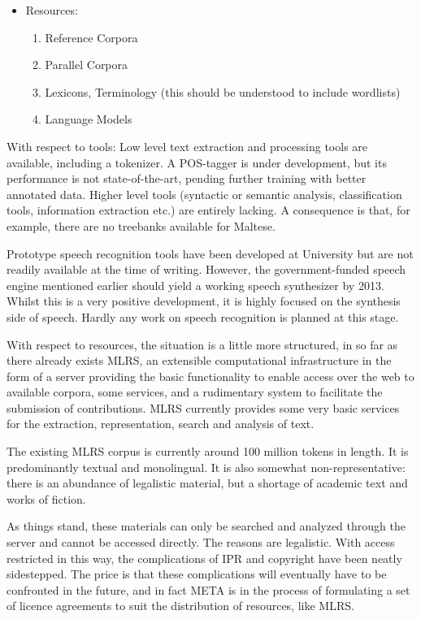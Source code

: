 \documentclass[]{../../metanetpaper}
\begin{document}
\begin{multicols}{2}
\begin{itemize}
\item Resources:
\begin{enumerate}
\item Reference Corpora
\item Parallel Corpora
\item Lexicons, Terminology (this should be understood to include wordlists)
\item Language Models
\end{enumerate}
\end{itemize}

With respect to tools:
Low level text extraction and processing tools are available, including a tokenizer. A POS-tagger is under development, but its performance is not state-of-the-art, pending further training with better annotated data. 
Higher level tools (syntactic or semantic analysis, classification tools, information extraction etc.) are entirely lacking. A consequence is that, for example, there are no treebanks available for Maltese.

Prototype speech recognition tools have been developed at University but are not readily available at the time of writing. However, the government-funded speech engine mentioned earlier should yield a working speech synthesizer by 2013. Whilst this is a very positive development, it is highly focused on the synthesis side of speech. Hardly any work on speech recognition is planned at this stage.

With respect to resources, the situation is a little more structured, in so far as there already exists MLRS, an extensible computational infrastructure in the form of a server providing the basic functionality to enable access over the web to available corpora, some services, and a rudimentary system to facilitate the submission of contributions. MLRS currently provides some very basic services for the extraction, representation, search and analysis of text.

The existing MLRS corpus is currently around 100 million tokens in length. It is predominantly textual and monolingual. It is also somewhat non-representative: there is an abundance of legalistic material, but a shortage of academic text and works of fiction.

As things stand, these materials can only be searched and analyzed through the server and cannot be accessed directly. The reasons are legalistic. With access restricted in this way, the complications of IPR and copyright have been neatly sidestepped. The price is that these complications will eventually have to be confronted in the future, and in fact META is in the process of formulating a set of licence agreements to suit the distribution of resources, like MLRS.



\end{multicols}
\end{document}
